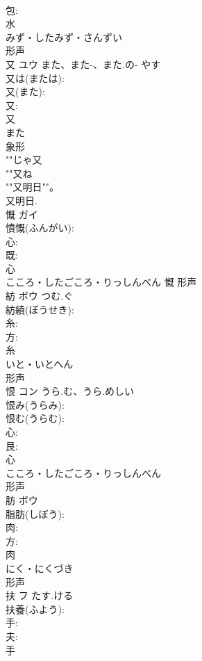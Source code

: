 \documentclass[8pt]{extreport}
\begin{document}
\begin{CJK}{UTF8}{min}
\\	包: 
\\	水	
\\	みず・したみず・さんずい	
\\	形声 
\\	又	ユウ	また、また-、また.の-	やす	
\\	又は(または): 
\\	又(また): 
\\	又: 
\\	又	
\\	また	
\\	象形 
\\	""じゃ又
\\	""又ね
\\	""又明日""。 
\\	又明日.
\\	慨	ガイ			
\\	憤慨(ふんがい): 
\\	心: 
\\	既: 
\\	心	
\\	こころ・したごころ・りっしんべん	慨	形声 
\\	紡	ボウ	つむ.ぐ		
\\	紡績(ぼうせき): 
\\	糸: 
\\	方: 
\\	糸	
\\	いと・いとへん	
\\	形声 
\\	恨	コン	うら.む、うら.めしい		
\\	恨み(うらみ): 
\\	恨む(うらむ): 
\\	心: 
\\	艮: 
\\	心	
\\	こころ・したごころ・りっしんべん	
\\	形声 
\\	肪	ボウ			
\\	脂肪(しぼう): 
\\	肉: 
\\	方: 
\\	肉	
\\	にく・にくづき	
\\	形声 
\\	扶	フ	たす.ける		
\\	扶養(ふよう): 
\\	手: 
\\	夫: 
\\	手	

\end{CJK}
\end{document}
